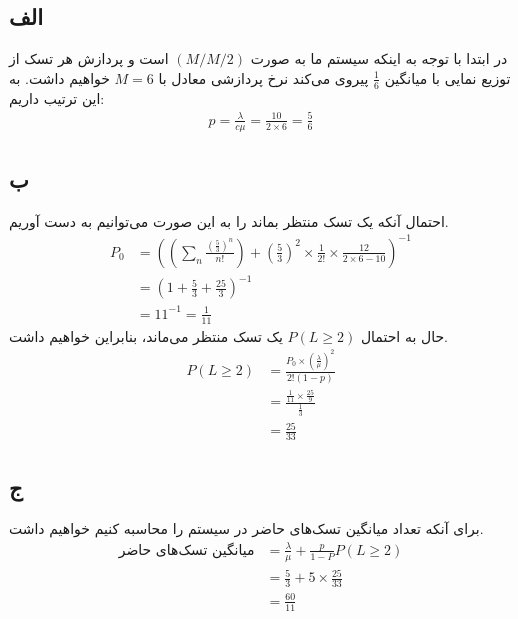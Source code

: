 \subsection*{الف}
در ابتدا با توجه به اینکه سیستم ما به صورت
$(M/M/2)$
است و پردازش هر تسک از توزیع نمایی با میانگین
$\frac{1}{6}$
پیروی می‌کند نرخ پردازشی معادل با
$M = 6$
خواهیم داشت. به این ترتیب داریم:
\begin{align*}
    p = \frac{\lambda}{c \mu} = \frac{10}{2 \times 6} = \frac{5}{6}
\end{align*}

\subsection*{ب}
احتمال آنکه یک تسک منتظر بماند را به این صورت می‌توانیم به دست آوریم.
\begin{align*}
    P_0 &= \left((\sum_n \frac{(\frac{5}{3})^n}{n!}) + (\frac{5}{3})^2 \times \frac{1}{2!} \times \frac{12}{2 \times 6 - 10}\right)^{-1} \\
    &= \left(1 + \frac{5}{3} + \frac{25}{3}\right)^{-1} \\
    &= 11^{-1} = \frac{1}{11}
\end{align*}
حال به احتمال
$P(L \geq 2)$
یک تسک منتظر می‌ماند، بنابراین خواهیم داشت.
\begin{align*}
    P(L \geq 2) &= \frac{P_0 \times (\frac{\lambda}{\mu})^2}{2! (1 - p)} \\
    &= \frac{\frac{1}{11} \times \frac{25}{9}}{\frac{1}{3}} \\
    &= \frac{25}{33}
\end{align*}

\subsection*{ج}
برای آنکه تعداد میانگین تسک‌های حاضر در سیستم را محاسبه کنیم خواهیم داشت.
\begin{align*}
    \text{میانگین تسک‌های حاضر} &= \frac{\lambda}{\mu} + \frac{p}{1 - P}P(L \geq 2) \\
    &= \frac{5}{3} + 5 \times \frac{25}{33} \\
    &= \frac{60}{11}
\end{align*}